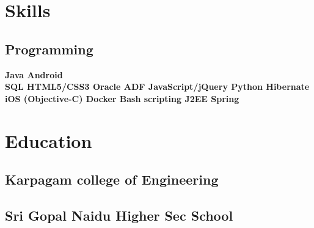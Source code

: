 \documentclass[a4paper]{srika-resume} %
\begin{document}
\begin{minipage}[t]{0.35\textwidth} %


\section{Skills}

\subsection{Programming}

\textbf{Java \textbullet{} Android} \\
\textbf{SQL \textbullet{} HTML5/CSS3 \textbullet{} Oracle ADF \textbullet{} JavaScript/jQuery \textbullet{} Python \textbullet{} Hibernate} \\
\textbf{iOS (Objective-C) \textbullet{} Docker \textbullet{} Bash scripting \textbullet{} J2EE \textbullet{} Spring} \\

\sectionspace %


\section{Education} 
\subsection{Karpagam college of Engineering}


\sectionspace %


\subsection{Sri Gopal Naidu Higher Sec School}



\end{minipage}
\end{document}

